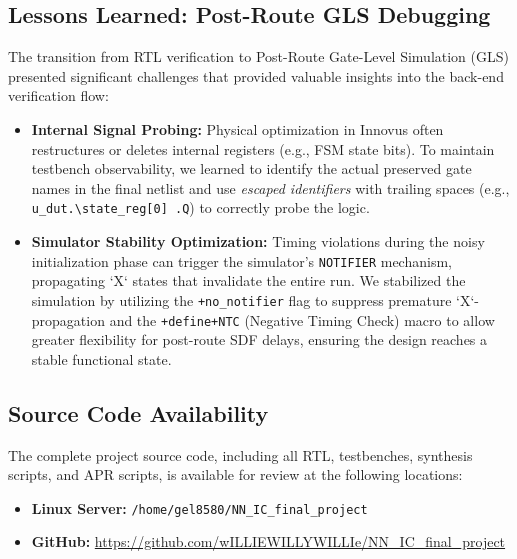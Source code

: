 \subsection{Lessons Learned: Post-Route GLS Debugging}
The transition from RTL verification to Post-Route Gate-Level Simulation (GLS) presented significant challenges that provided valuable insights into the back-end verification flow:
\begin{itemize}
    \item \textbf{Internal Signal Probing:} Physical optimization in Innovus often restructures or deletes internal registers (e.g., FSM state bits). To maintain testbench observability, we learned to identify the actual preserved gate names in the final netlist and use \textit{escaped identifiers} with trailing spaces (e.g., \texttt{u\_dut.\textbackslash state\_reg[0] .Q}) to correctly probe the logic.
    \item \textbf{Simulator Stability Optimization:} Timing violations during the noisy initialization phase can trigger the simulator's \texttt{NOTIFIER} mechanism, propagating `X` states that invalidate the entire run. We stabilized the simulation by utilizing the \texttt{+no\_notifier} flag to suppress premature `X`-propagation and the \texttt{+define+NTC} (Negative Timing Check) macro to allow greater flexibility for post-route SDF delays, ensuring the design reaches a stable functional state.
\end{itemize}

\subsection{Source Code Availability}
The complete project source code, including all RTL, testbenches, synthesis scripts, and APR scripts, is available for review at the following locations:
\begin{itemize}
    \item \textbf{Linux Server:} \texttt{/home/gel8580/NN\_IC\_final\_project}
    \item \textbf{GitHub:} \url{https://github.com/wILLIEWILLYWILLIe/NN_IC_final_project}
\end{itemize}
